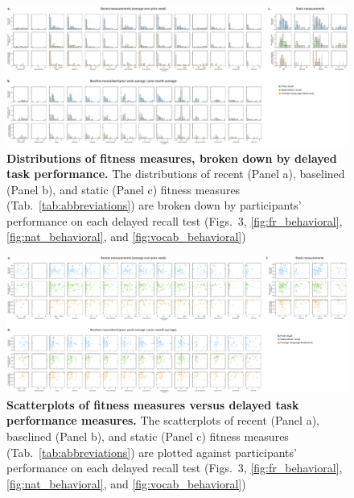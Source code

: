 \documentclass[10pt]{article}
\newcommand{\delayedBehavior}{3}
\begin{document}
\begin{figure}
\centering
\includegraphics[width=\textwidth]{figs/fitness_dists_delayed}
\caption{\textbf{Distributions of fitness measures, broken down
    by delayed task performance.} The distributions of recent
  (Panel a), baselined (Panel b), and static (Panel c) fitness
  measures (Tab.~\ref{tab:abbreviations}) are broken down by
  participants' performance on each delayed recall test
  (Figs.~\delayedBehavior, \ref{fig:fr_behavioral},
  \ref{fig:nat_behavioral}, and \ref{fig:vocab_behavioral})}
\label{fig:fitness_dists_delayed}
\end{figure}

\begin{figure}
\centering
\includegraphics[width=\textwidth]{figs/fitness_scatter_delayed}
\caption{\textbf{Scatterplots of fitness measures versus
    delayed task performance measures.} The scatterplots of recent
  (Panel a), baselined (Panel b), and static (Panel c) fitness
  measures (Tab.~\ref{tab:abbreviations}) are plotted against 
  participants' performance on each delayed recall test
  (Figs.~\delayedBehavior, \ref{fig:fr_behavioral},
  \ref{fig:nat_behavioral}, and \ref{fig:vocab_behavioral})}
\label{fig:fitness_scatters_delayed}
\end{figure}
\end{document}
